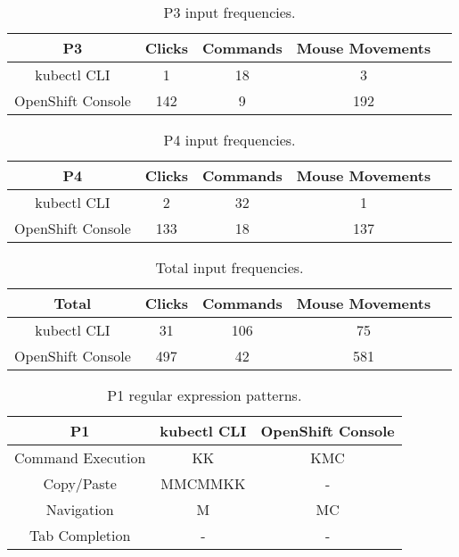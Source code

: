 \documentclass[11pt, oneside]{article}   	%
\begin{document}
\begin{table}
 \centering
  \begin{tabular}{ | c | c | c | c | c | } 
  \hline
  P3 & Clicks & Commands & Mouse Movements \\ 
  \hline
  kubectl CLI & 1 & 18 & 3 \\ 
  \hline
  OpenShift Console & 142 & 9 & 192 \\ 
  \hline
  \end{tabular}
 \caption{P3 input frequencies.}
 \label{table:t3}
\end{table}

\begin{table}
 \centering
  \begin{tabular}{ | c | c | c | c | c | } 
  \hline
  P4 & Clicks & Commands & Mouse Movements \\ 
  \hline
  kubectl CLI & 2 & 32 & 1 \\ 
  \hline
  OpenShift Console & 133 & 18 & 137 \\ 
  \hline
  \end{tabular}
 \caption{P4 input frequencies.}
 \label{table:t4}
\end{table}

\begin{table}
 \centering
  \begin{tabular}{ | c | c | c | c | c | } 
  \hline
  Total & Clicks & Commands & Mouse Movements \\ 
  \hline
  kubectl CLI & 31 & 106 & 75 \\ 
  \hline
  OpenShift Console & 497 & 42 & 581 \\ 
  \hline
  \end{tabular}
 \caption{Total input frequencies.}
 \label{table:t5}
\end{table}

\begin{table}
 \centering
  \begin{tabular}{ | c | c | c | } 
  \hline
  P1 & kubectl CLI & OpenShift Console \\ 
  \hline
  Command Execution & KK & KMC \\ 
  \hline
  Copy/Paste &MMCMMKK & - \\
  \hline
  Navigation & M & MC \\
  \hline
  Tab Completion & - & - \\
  \hline
  \end{tabular}
 \caption{P1 regular expression patterns.}
 \label{table:t6}
\end{table}
\end{document}
